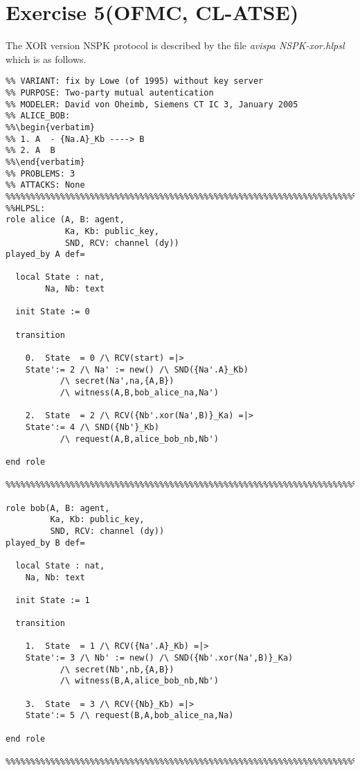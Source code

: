 \documentclass[a4paper, 12pt]{report}
\begin{document}
\chapter* {Exercise 5(OFMC, CL-ATSE)}
%
        The XOR version NSPK protocol is described by the file \emph{avispa NSPK-xor.hlpsl} which is as follows.
        \begin{lstlisting}[frame=single]
%% PROTOCOL*: NSPK: Needham-Schroeder Public-Key Protocol
%% VARIANT: fix by Lowe (of 1995) without key server
%% PURPOSE: Two-party mutual autentication
%% MODELER: David von Oheimb, Siemens CT IC 3, January 2005
%% ALICE_BOB:
%%\begin{verbatim}
%% 1. A  - {Na.A}_Kb ----> B
%% 2. A  B
%%\end{verbatim}
%% PROBLEMS: 3
%% ATTACKS: None
%%%%%%%%%%%%%%%%%%%%%%%%%%%%%%%%%%%%%%%%%%%%%%%%%%%%%%%%%%%%%%%%%%%%%%%%
%%HLPSL:
role alice (A, B: agent,             
            Ka, Kb: public_key,      
            SND, RCV: channel (dy)) 
played_by A def=

  local State : nat, 
        Na, Nb: text

  init State := 0

  transition  
   
    0.  State  = 0 /\ RCV(start) =|> 
	State':= 2 /\ Na' := new() /\ SND({Na'.A}_Kb)
		   /\ secret(Na',na,{A,B}) 
		   /\ witness(A,B,bob_alice_na,Na')

    2.  State  = 2 /\ RCV({Nb'.xor(Na',B)}_Ka) =|> 
	State':= 4 /\ SND({Nb'}_Kb) 
		   /\ request(A,B,alice_bob_nb,Nb')

end role

%%%%%%%%%%%%%%%%%%%%%%%%%%%%%%%%%%%%%%%%%%%%%%%%%%%%%%%%%%%%%%%%%%%%%%%%

role bob(A, B: agent,      
         Ka, Kb: public_key,      
         SND, RCV: channel (dy)) 
played_by B def=

  local State : nat, 
	Na, Nb: text

  init State := 1

  transition 

    1.  State  = 1 /\ RCV({Na'.A}_Kb) =|> 
	State':= 3 /\ Nb' := new() /\ SND({Nb'.xor(Na',B)}_Ka)
		   /\ secret(Nb',nb,{A,B}) 
		   /\ witness(B,A,alice_bob_nb,Nb')

    3.  State  = 3 /\ RCV({Nb}_Kb) =|> 
	State':= 5 /\ request(B,A,bob_alice_na,Na)

end role

%%%%%%%%%%%%%%%%%%%%%%%%%%%%%%%%%%%%%%%%%%%%%%%%%%%%%%%%%%%%%%%%%%%%%%%%


\end{lstlisting}
\end{document}
